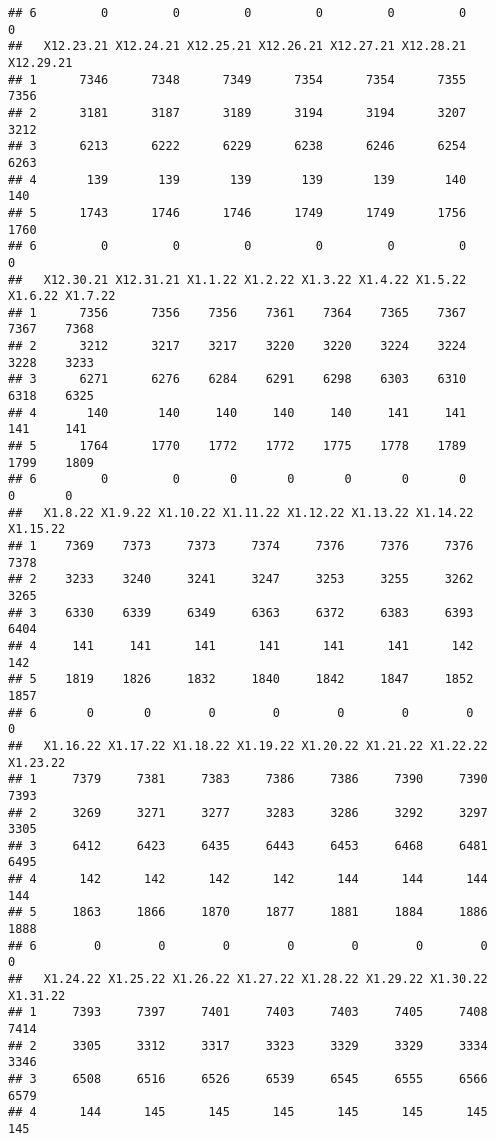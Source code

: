 \documentclass[
]{article}
\begin{document}
\begin{verbatim}
## 6         0         0         0         0         0         0         0
##   X12.23.21 X12.24.21 X12.25.21 X12.26.21 X12.27.21 X12.28.21 X12.29.21
## 1      7346      7348      7349      7354      7354      7355      7356
## 2      3181      3187      3189      3194      3194      3207      3212
## 3      6213      6222      6229      6238      6246      6254      6263
## 4       139       139       139       139       139       140       140
## 5      1743      1746      1746      1749      1749      1756      1760
## 6         0         0         0         0         0         0         0
##   X12.30.21 X12.31.21 X1.1.22 X1.2.22 X1.3.22 X1.4.22 X1.5.22 X1.6.22 X1.7.22
## 1      7356      7356    7356    7361    7364    7365    7367    7367    7368
## 2      3212      3217    3217    3220    3220    3224    3224    3228    3233
## 3      6271      6276    6284    6291    6298    6303    6310    6318    6325
## 4       140       140     140     140     140     141     141     141     141
## 5      1764      1770    1772    1772    1775    1778    1789    1799    1809
## 6         0         0       0       0       0       0       0       0       0
##   X1.8.22 X1.9.22 X1.10.22 X1.11.22 X1.12.22 X1.13.22 X1.14.22 X1.15.22
## 1    7369    7373     7373     7374     7376     7376     7376     7378
## 2    3233    3240     3241     3247     3253     3255     3262     3265
## 3    6330    6339     6349     6363     6372     6383     6393     6404
## 4     141     141      141      141      141      141      142      142
## 5    1819    1826     1832     1840     1842     1847     1852     1857
## 6       0       0        0        0        0        0        0        0
##   X1.16.22 X1.17.22 X1.18.22 X1.19.22 X1.20.22 X1.21.22 X1.22.22 X1.23.22
## 1     7379     7381     7383     7386     7386     7390     7390     7393
## 2     3269     3271     3277     3283     3286     3292     3297     3305
## 3     6412     6423     6435     6443     6453     6468     6481     6495
## 4      142      142      142      142      144      144      144      144
## 5     1863     1866     1870     1877     1881     1884     1886     1888
## 6        0        0        0        0        0        0        0        0
##   X1.24.22 X1.25.22 X1.26.22 X1.27.22 X1.28.22 X1.29.22 X1.30.22 X1.31.22
## 1     7393     7397     7401     7403     7403     7405     7408     7414
## 2     3305     3312     3317     3323     3329     3329     3334     3346
## 3     6508     6516     6526     6539     6545     6555     6566     6579
## 4      144      145      145      145      145      145      145      145

\end{verbatim}
\end{document}

